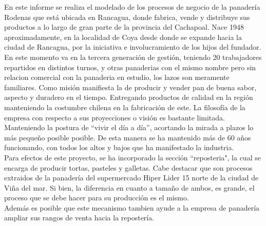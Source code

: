 En este informe se realiza el modelado de los procesos de negocio de la panadería Rodenas que está ubicada en Rancagua, donde fabrica, vende y distribuye sus productos a lo largo de gran parte de la provincia del Cachapoal. Nace 1948 aproximadamente, en la localidad de Coya desde donde se expande hacia la ciudad de Rancagua, por la iniciativa e involucramiento de los hijos del fundador. En este momento va en la tercera generación de gestión, teniendo 20 trabajadores repartidos en distintos turnos, y otras panaderias con el mismo nombre pero sin relacion comercial con la panaderia en estudio, los lazos son meramente familiares.
Como misión manifiesta la de producir y vender pan de buena sabor, aspecto y duradero en el tiempo. Entregando productos de calidad en la región manteniendo la costumbre chilena en la fabricación de este.
La filosofía de la empresa con respecto a sus proyecciones o visión es bastante limitada. Manteniendo la postura de “vivir el día a día”, acortando la mirada a plazos lo más pequeño posible posible. De esta manera se ha mantenido más de 60 años funcionando, con todos los altos y bajos que ha manifestado la industria.
\\
Para efectos de este proyecto, se ha incorporado la sección ``reposteria", la cual se encarga de producir tortas, pasteles y galletas. Cabe destacar que son procesos extraidos de la panadería del supermercado Hiper Lider 15 norte de la ciudad de Viña del mar. Si bien, la diferencia en cuanto a tamaño de ambos, es grande, el proceso que se debe hacer para su producción es el mismo. \\
Además es posible que este mecanismo tambien ayude a la empresa de panadería ampliar sus rangos de venta hacia la repostería.